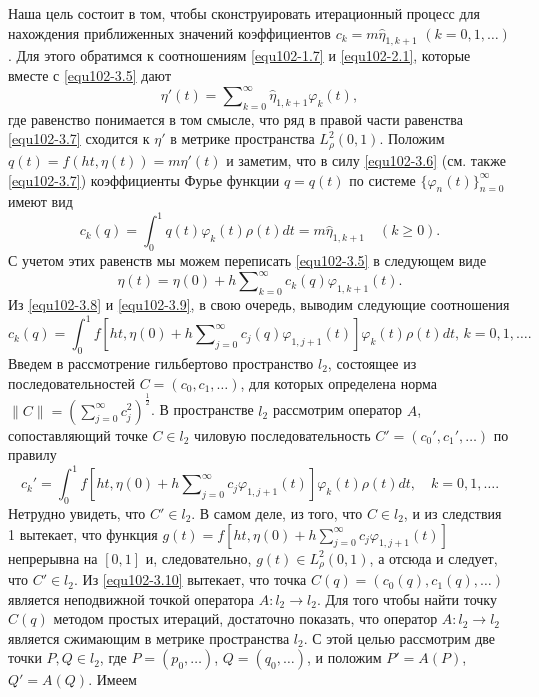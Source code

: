 Наша цель состоит в том, чтобы сконструировать итерационный процесс для нахождения приближенных значений коэффициентов $c_k=m\hat \eta_{1,k+1}$ $(k=0,1,\ldots)$. Для этого обратимся к соотношениям \eqref{equ102-1.7} и \eqref{equ102-2.1}, которые вместе с \eqref{equ102-3.5} дают
\begin{equation}\label{equ102-3.7}
\eta'(t)=  \sum\nolimits_{k=0}^\infty \hat \eta_{1,k+1}\varphi_k(t),
\end{equation}
где равенство понимается в том смысле, что ряд в правой части равенства \eqref{equ102-3.7} сходится к $\eta'$ в метрике пространства $L^2_{\rho}(0,1)$. Положим $q(t)=f(ht,\eta(t))=m\eta'(t)$ и заметим, что в силу  \eqref{equ102-3.6} (см. также \eqref{equ102-3.7}) коэффициенты Фурье функции $q=q(t)$ по системе  $\{\varphi_{n}(t)\}_{n=0}^\infty$ имеют вид
\begin{equation}\label{equ102-3.8}
 c_k(q)=\int_{0}^1 q(t)\varphi_{k}(t)\rho(t)dt=m\hat \eta_{1,k+1} \quad (k\ge0).
\end{equation}
С учетом этих равенств мы можем переписать \eqref{equ102-3.5} в следующем виде
\begin{equation}\label{equ102-3.9}
\eta(t)= \eta(0)+ h\sum\nolimits_{k=0}^\infty c_k(q){\varphi}_{1,k+1}(t).
\end{equation}
Из  \eqref{equ102-3.8} и \eqref{equ102-3.9}, в свою очередь, выводим следующие соотношения
\begin{equation}\label{equ102-3.10}
c_k(q)=\int_{0}^1f\left[ht,\eta(0)+ h\sum\nolimits_{j=0}^\infty c_j(q)\varphi_{1,j+1}(t)\right]\varphi_k(t)\rho(t) dt,\, k=0,1,\ldots.
\end{equation}
Введем в рассмотрение гильбертово пространство $l_2$, состоящее из последовательностей $C=(c_0,c_1,\ldots)$, для которых определена норма
$\|C\|=\left(\sum_{j=0}^\infty c_j^2\right)^\frac12$.  В пространстве $l_2$ рассмотрим оператор $A$, сопоставляющий точке $C\in l_2$ чиловую последовательность $C'=(c_0',c_1',\ldots)$ по правилу
\begin{equation}\label{equ102-3.11}
c_k'=\int_{0}^1f\left[ht,\eta(0)+ h\sum\nolimits_{j=0}^\infty c_j
\varphi_{1,j+1}(t)\right]\varphi_k(t)\rho(t) dt,\quad k=0,1,\ldots.
\end{equation}
Нетрудно увидеть, что $C'\in l_2$. В самом деле, из того, что $C\in l_2$, и из следствия 1 вытекает, что функция $g(t)=f[ht,\eta(0)+ h\sum\nolimits_{j=0}^\infty c_j
\varphi_{1,j+1}(t)]$ непрерывна на $[0,1]$ и, следовательно, $g(t)\in L^2_\rho(0,1)$, а отсюда и следует, что $C'\in l_2$. Из  \eqref{equ102-3.10} вытекает, что точка $C(q)=(c_0(q),c_1(q),\ldots)$ является неподвижной точкой оператора $A:l_2\to l_2$. Для того чтобы найти точку $C(q)$ методом простых итераций, достаточно показать, что оператор $A:l_2\to l_2$ является сжимающим в метрике пространства $l_2$. С этой целью рассмотрим две точки $P,Q\in l_2$, где $P=(p_0,\ldots)$, $Q=(q_0,\ldots)$, и положим $P'=A(P)$, $Q'=A(Q)$. Имеем
